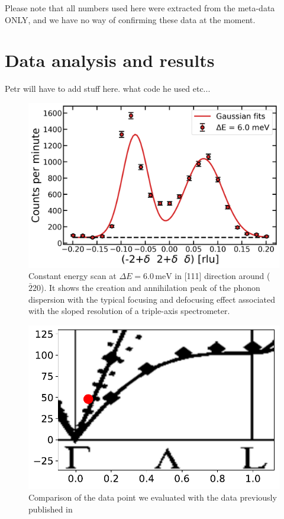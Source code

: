 \documentclass[aps,prx,reprint,amsmath,amssymb,superscriptaddress,showpacs]{revtex4-1}
\begin{document}
Please note that all numbers used here were extracted from the meta-data ONLY, and we have no way of confirming these data at the moment. 


\section{Data analysis and results}

Petr will have to add stuff here. what code he used etc...

\begin{figure}
    \includegraphics[width=1.0\linewidth]{mini-school-si-cescan.png}
    \caption{\label{fig1} Constant energy scan at $\Delta E = 6.0\,\mathrm{meV}$ in [111] direction around ($\bar{2}20$). It shows the creation and annihilation peak of the phonon dispersion with the typical focusing and defocusing effect associated with the sloped resolution of a triple-axis spectrometer.}
\end{figure}

\begin{figure}
    \includegraphics[width=1.0\linewidth]{dispersion.pdf}
    \caption{Comparison of the data point we evaluated with the data previously published in \cite{Aouissi} }
    \label{fig2}
\end{figure}
\end{document}
